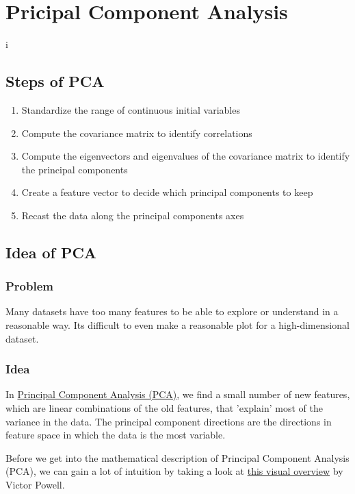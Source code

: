 \documentclass{article}
\begin{document}
\section{Pricipal Component Analysis}

i\subsection{Steps of PCA}
\begin{enumerate}
								\item Standardize the range of continuous initial variables
								\item Compute the covariance matrix to identify correlations

								\item Compute the eigenvectors and eigenvalues of the covariance matrix to identify the principal components
								
								\item Create a feature vector to decide which principal components to keep
								\item Recast the data along the principal components axes

\end{enumerate}

\subsection{Idea of PCA}

\subsubsection{Problem} Many datasets have too many features to be able to explore or understand in a reasonable way. Its difficult to even make a reasonable plot for a high-dimensional dataset.

\subsubsection{Idea} In \href{https://en.wikipedia.org/wiki/Principal_component_analysis}{Principal Component Analysis (PCA)}, we find a small number of new features, which are linear combinations of the old features, that 'explain' most of the variance in the data. The principal component directions are the directions in feature space in which the data is the most variable. 

Before we get into the mathematical description of Principal Component Analysis (PCA), we can gain a lot of intuition by taking a look at \href{http://setosa.io/ev/principal-component-analysis/}{this visual overview} by Victor Powell.
\end{document}
